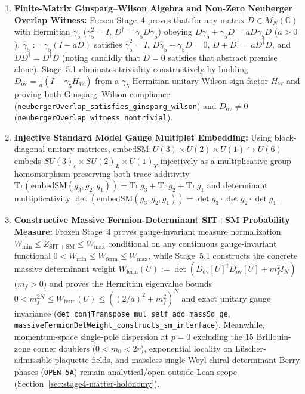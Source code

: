 \begin{enumerate}[leftmargin=2em]
  \item \textbf{Finite-Matrix Ginsparg--Wilson Algebra and Non-Zero Neuberger Overlap Witness:} Frozen Stage~4 proves that for any matrix $D \in M_N(\mathbb{C})$ with Hermitian $\gamma_5$ ($\gamma_5^2 = I$, $D^\dagger = \gamma_5 D \gamma_5$) obeying $D\gamma_5 + \gamma_5 D = a D\gamma_5 D$ ($a > 0$), $\hat{\gamma}_5 := \gamma_5(I - a D)$ satisfies $\hat{\gamma}_5^2 = I$, $D\hat{\gamma}_5 + \gamma_5 D = 0$, $D + D^\dagger = a D^\dagger D$, and $D D^\dagger = D^\dagger D$ (noting candidly that $D = 0$ satisfies that abstract premise alone). Stage~5.1 eliminates triviality constructively by building $D_{\mathrm{ov}} = \frac{1}{a}(I - \gamma_5 H_W)$ from a $\gamma_5$-Hermitian unitary Wilson sign factor $H_W$ and proving both Ginsparg--Wilson compliance (\texttt{neuberger\allowbreak{}Overlap\_\allowbreak{}satisfies\_\allowbreak{}ginsparg\_\allowbreak{}wilson}) and $D_{\mathrm{ov}} \ne 0$ (\texttt{neuberger\allowbreak{}Overlap\_\allowbreak{}witness\_\allowbreak{}nontrivial}).
  \item \textbf{Injective Standard Model Gauge Multiplet Embedding:} Using block-diagonal unitary matrices, $\mathrm{embedSM} : U(3) \times U(2) \times U(1) \hookrightarrow U(6)$ embeds $SU(3)_c \times SU(2)_L \times U(1)_Y$ injectively as a multiplicative group homomorphism preserving both trace additivity $\mathrm{Tr}(\mathrm{embedSM}(g_3,g_2,g_1)) = \mathrm{Tr}\,g_3 + \mathrm{Tr}\,g_2 + \mathrm{Tr}\,g_1$ and determinant multiplicativity $\det(\mathrm{embedSM}(g_3,g_2,g_1)) = \det g_3 \cdot \det g_2 \cdot \det g_1$.
  \item \textbf{Constructive Massive Fermion-Determinant SIT+SM Probability Measure:} Frozen Stage~4 proves gauge-invariant measure normalization $W_{\min} \le Z_{\mathrm{SIT+SM}} \le W_{\max}$ conditional on any continuous gauge-invariant functional $0 < W_{\min} \le W_{\mathrm{ferm}} \le W_{\max}$, while Stage~5.1 constructs the concrete massive determinant weight $W_{\mathrm{ferm}}(U) := \det(D_{\mathrm{ov}}[U]^\dagger D_{\mathrm{ov}}[U] + m_f^2 I_N)$ ($m_f > 0$) and proves the Hermitian eigenvalue bounds $0 < m_f^{2N} \le W_{\mathrm{ferm}}(U) \le ((2/a)^2 + m_f^2)^N$ and exact unitary gauge invariance (\texttt{det\_\allowbreak{}conj\allowbreak{}Transpose\_\allowbreak{}mul\_\allowbreak{}self\_\allowbreak{}add\_\allowbreak{}mass\allowbreak{}Sq\_\allowbreak{}ge}, \texttt{massive\allowbreak{}Fermion\allowbreak{}Det\allowbreak{}Weight\_\allowbreak{}constructs\_\allowbreak{}sm\_\allowbreak{}interface}). Meanwhile, momentum-space single-pole dispersion at $p = 0$ excluding the $15$ Brillouin-zone corner doublers ($0 < m_0 < 2r$), exponential locality on L\"uscher-admissible plaquette fields, and massless single-Weyl chiral determinant Berry phases (\texttt{OPEN-5A}) remain analytical/open outside Lean scope (Section~\ref{sec:stage4-matter-holonomy}).
\end{enumerate}

